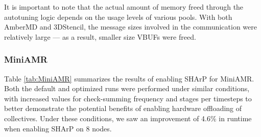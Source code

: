 It is important to note that the actual amount of memory freed through the autotuning logic depends on the usage levels of various pools. With both AmberMD and 3DStencil, the message sizes involved in the communication were relatively large --- as a result, smaller size VBUFs were freed.

\begin{table}[!htbp]
  \centering
  \small
  \captionsetup{justification=centering}
  \caption{3DStencil: Impact of Eager threshold and autotuning}
  \label{tab:3DStencil}
\end{table}
\subsubsection{MiniAMR}
Table \ref{tab:MiniAMR} summarizes the results of enabling SHArP for MiniAMR. Both the default and optimized runs were performed under similar conditions, with increased values for check-summing frequency and stages per timesteps to better demonstrate the potential benefits of enabling hardware offloading of collectives. Under these conditions, we saw an improvement of 4.6\% in runtime when enabling SHArP on 8 nodes. 

